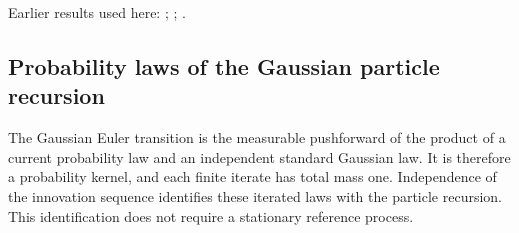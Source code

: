 \documentclass[11pt,a4paper]{report}
\begin{document}
Earlier results used here: \cite[Section~3.16]{LangevinLean2026IPLA}; \cite[Section~3.5]{LangevinLean2026IPLA}; \cite[Section~3.34]{LangevinLean2026ULALSI}.
\subsection{\texorpdfstring{Probability laws of the Gaussian particle recursion}{Probability laws of the Gaussian particle recursion}}
\label{report-step-IPLA-LSI-Theorem-lean-1}


The Gaussian Euler transition is the measurable pushforward of the product of a current probability law and an independent standard Gaussian law. It is therefore a probability kernel, and each finite iterate has total mass one. Independence of the innovation sequence identifies these iterated laws with the particle recursion. This identification does not require a stationary reference process.
\end{document}
